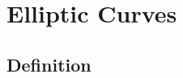 \documentclass[Total.tex]{subfiles}
\begin{document}
	\chapter{Elliptic Curves}
		\section{Definition}
		\section{}
\end{document}

